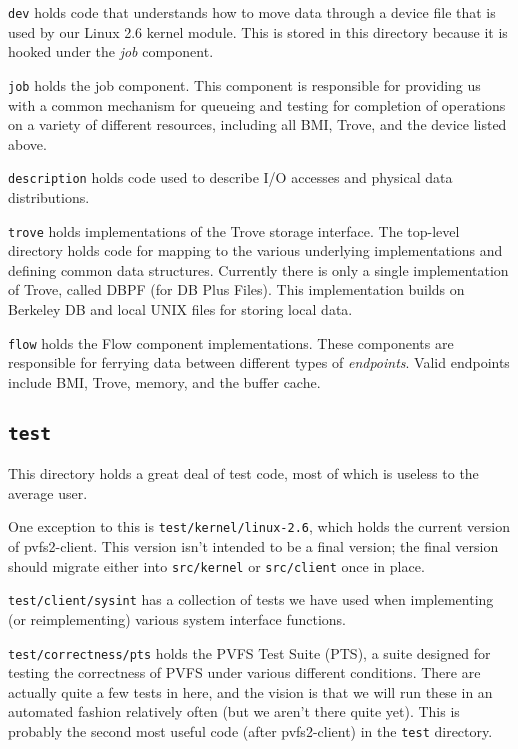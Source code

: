 \texttt{dev} holds code that understands how to move data through a device
file that is used by our Linux 2.6 kernel module.  This is stored in this
directory because it is hooked under the \emph{job} component.

\texttt{job} holds the job component.  This component is responsible for
providing us with a common mechanism for queueing and testing for completion
of operations on a variety of different resources, including all BMI, Trove,
and the device listed above.

\texttt{description} holds code used to describe I/O accesses and physical
data distributions.

\texttt{trove} holds implementations of the Trove storage interface.  The
top-level directory holds code for mapping to the various underlying
implementations and defining common data structures.  Currently there is only
a single implementation of Trove, called DBPF (for DB Plus Files).  This
implementation builds on Berkeley DB and local UNIX files for storing local
data.

\texttt{flow} holds the Flow component implementations.  These components are
responsible for ferrying data between different types of \emph{endpoints}.
Valid endpoints include BMI, Trove, memory, and the buffer cache.

\subsection{\texttt{test}}

This directory holds a great deal of test code, most of which is useless to
the average user.

One exception to this is \texttt{test/kernel/linux-2.6}, which holds the
current version of pvfs2-client.  This version isn't intended to be a final
version; the final version should migrate either into \texttt{src/kernel} or
\texttt{src/client} once in place.

\texttt{test/client/sysint} has a collection of tests we have used when
implementing (or reimplementing) various system interface functions.

\texttt{test/correctness/pts} holds the PVFS Test Suite (PTS), a suite
designed for testing the correctness of PVFS under various different
conditions.  There are actually quite a few tests in here, and the vision is
that we will run these in an automated fashion relatively often (but we aren't
there quite yet).  This is probably the second most useful code (after
pvfs2-client) in the \texttt{test} directory.

